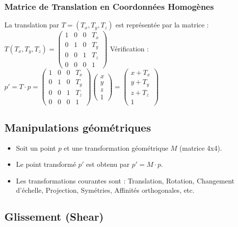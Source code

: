 \documentclass{article}
\begin{document}
\subsubsection{Matrice de Translation en Coordonnées Homogènes}
La translation par $T=(T_x, T_y, T_z)$ est représentée par la matrice :
$T(T_x, T_y, T_z) = \begin{pmatrix} 1 & 0 & 0 & T_x \\ 0 & 1 & 0 & T_y \\ 0 & 0 & 1 & T_z \\ 0 & 0 & 0 & 1 \end{pmatrix}$
Vérification :
$p' = T \cdot p = \begin{pmatrix} 1 & 0 & 0 & T_x \\ 0 & 1 & 0 & T_y \\ 0 & 0 & 1 & T_z \\ 0 & 0 & 0 & 1 \end{pmatrix} \begin{pmatrix} x \\ y \\ z \\ 1 \end{pmatrix} = \begin{pmatrix} x + T_x \\ y + T_y \\ z + T_z \\ 1 \end{pmatrix}$

\subsection{Manipulations géométriques}

\begin{itemize}
    \item Soit un point $p$ et une transformation géométrique $M$ (matrice 4x4).
    \item Le point transformé $p'$ est obtenu par $p' = M \cdot p$.
    \item Les transformations courantes sont : Translation, Rotation, Changement d'échelle, Projection, Symétries, Affinités orthogonales, etc.
\end{itemize}

\subsection{Glissement (Shear)}
\end{document}

